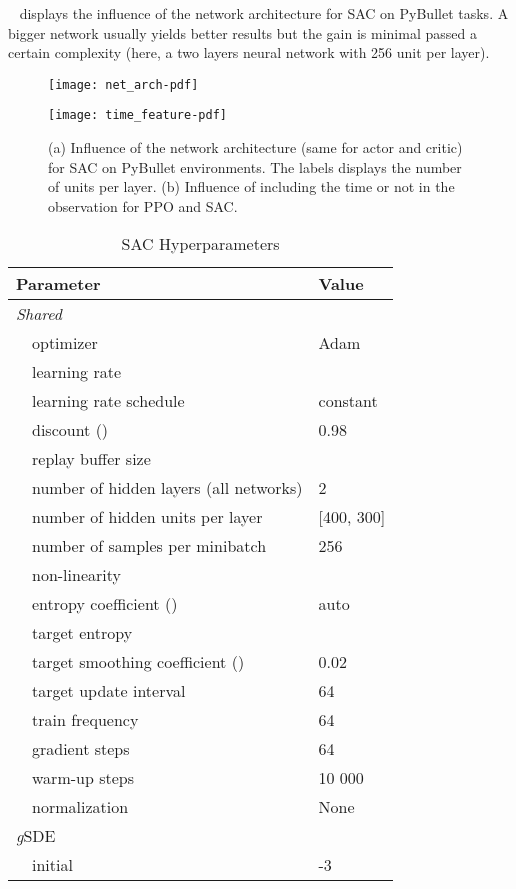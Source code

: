 \documentclass{article}
\newcommand{\ourSDE}{\textit{g}\textsc{SDE}\xspace}
\newcommand{\ppo}{\textsc{PPO}\xspace}
\newcommand{\sac}{\textsc{SAC}\xspace}
\begin{document}
~ displays the influence of the network architecture for \sac on PyBullet tasks. A bigger network usually yields better results but the gain is minimal passed a certain complexity (here, a two layers neural network with 256 unit per layer).

\begin{figure}[h]
  \begin{minipage}[t]{.5\linewidth}
    \centering\texttt{[image: net\_arch-pdf]}
    \label{fig:net-arch}
  \end{minipage}
  \begin{minipage}[t]{.5\linewidth}
    \centering\texttt{[image: time\_feature-pdf]}
    \label{fig:time-wrapper}
  \end{minipage}
  \caption{(a) Influence of the network architecture (same for actor and critic) for \sac on PyBullet environments. The labels displays the number of units per layer. (b) Influence of including the time or not in the observation for \ppo and \sac.}
\end{figure}

\begin{table}[h]
\renewcommand{\arraystretch}{1.1}
\centering
\caption{\sac Hyperparameters}
\label{tab:sac_shared_params}
\vspace{1mm}
  \begin{tabular}{@{}l l| l@{}}
    \toprule
    \multicolumn{2}{l|}{Parameter} &  Value\\
    \midrule
    \multicolumn{2}{l|}{\textit{Shared}}& \\
    & optimizer & Adam~\citep{kingma2014adam}\\
    & learning rate & \\
    & learning rate schedule & constant \\
    & discount () &  0.98\\
    & replay buffer size & \\
    & number of hidden layers (all networks) & 2\\
    & number of hidden units per layer & [400, 300]\\
    & number of samples per minibatch & 256\\
    & non-linearity & \\
    & entropy coefficient () & auto\\
    & target entropy & \\
    & target smoothing coefficient ()& 0.02\\
    & target update interval & 64\\
    & train frequency & 64\\
    & gradient steps & 64\\
    & warm-up steps & 10 000\\
    & normalization & None\\
    \midrule
    \multicolumn{2}{l|}{\ourSDE}& \\
    & initial  & -3\\
    \bottomrule
  \end{tabular}
\end{table}
\end{document}
